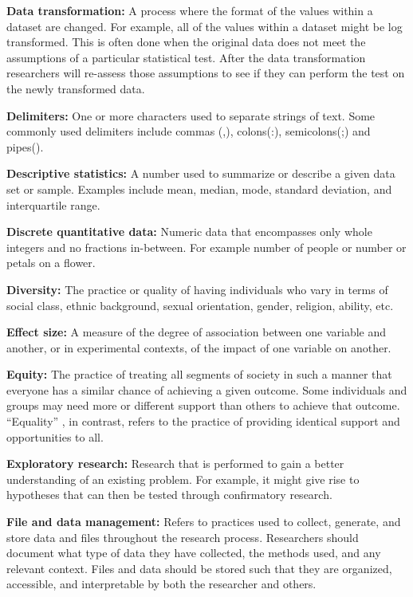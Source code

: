 \documentclass[
]{book}
\begin{document}
\textbf{Data transformation:} A process where the format of the values within a dataset are changed. For example, all of the values within a dataset might be log transformed. This is often done when the original data does not meet the assumptions of a particular statistical test. After the data transformation researchers will re-assess those assumptions to see if they can perform the test on the newly transformed data.

\textbf{Delimiters:} One or more characters used to separate strings of text. Some commonly used delimiters include commas (,), colons(:), semicolons(;) and pipes(\textbar).

\textbf{Descriptive statistics:} A number used to summarize or describe a given data set or sample. Examples include mean, median, mode, standard deviation, and interquartile range.

\textbf{Discrete quantitative data:} Numeric data that encompasses only whole integers and no fractions in-between. For example number of people or number or petals on a flower.

\textbf{Diversity:} The practice or quality of having individuals who vary in terms of social class, ethnic background, sexual orientation, gender, religion, ability, etc.

\textbf{Effect size:} A measure of the degree of association between one variable and another, or in experimental contexts, of the impact of one variable on another.

\textbf{Equity:} The practice of treating all segments of society in such a manner that everyone has a similar chance of achieving a given outcome. Some individuals and groups may need more or different support than others to achieve that outcome. ``Equality'' , in contrast, refers to the practice of providing identical support and opportunities to all.

\textbf{Exploratory research:} Research that is performed to gain a better understanding of an existing problem. For example, it might give rise to hypotheses that can then be tested through confirmatory research.

\textbf{File and data management:} Refers to practices used to collect, generate, and store data and files throughout the research process. Researchers should document what type of data they have collected, the methods used, and any relevant context. Files and data should be stored such that they are organized, accessible, and interpretable by both the researcher and others.
\end{document}
